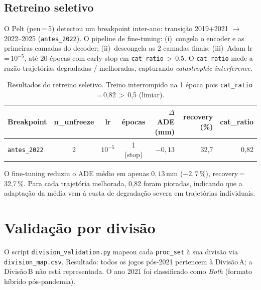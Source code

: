 \documentclass[11pt,a4paper]{article}
\begin{document}
\subsection{Retreino seletivo}

O Pelt (pen\,=\,5) detectou um breakpoint inter-ano: transi\c{c}\~ao
2019+2021 $\to$ 2022--2025 (\texttt{antes\_2022}). O pipeline de
fine-tuning: (i)~congela o encoder e as primeiras camadas do decoder;
(ii)~descongela as 2 camadas finais; (iii)~Adam lr\,=\,$10^{-5}$,
at\'e 20 \'epocas com early-stop em \texttt{cat\_ratio}\,$>$\,0{,}5.
O \texttt{cat\_ratio} mede a raz\~ao trajet\'orias degradadas /
melhoradas, capturando \emph{catastrophic interference}.

\begin{table}[h]
\centering
\small
\begin{tabular}{l c c c r r r}
\toprule
\textbf{Breakpoint} & \textbf{n\_unfreeze} & \textbf{lr}
    & \textbf{\'epocas} & \textbf{$\Delta$ADE (mm)}
    & \textbf{recovery (\%)} & \textbf{cat\_ratio} \\
\midrule
\texttt{antes\_2022} & 2 & $10^{-5}$ & 1 (stop) & $-0{,}13$ & 32{,}7 & 0{,}82 \\
\bottomrule
\end{tabular}
\caption{Resultados do retreino seletivo. Treino interrompido na 1\textordfeminine{} \'epoca
         pois \texttt{cat\_ratio}\,=\,0{,}82\,$>$\,0{,}5 (limiar).}
\label{tab:retrain}
\end{table}

O fine-tuning reduziu o ADE m\'edio em apenas $0{,}13$\,mm ($-2{,}7\,\%$),
recovery\,=\,32{,}7\,\%. Para cada trajet\'oria melhorada, 0{,}82 foram
pioradas, indicando que a adapta\c{c}\~ao da m\'edia vem \`a custa de
degrada\c{c}\~ao severa em trajet\'orias individuais.

\section{Valida\c{c}\~ao por divis\~ao}

O script \texttt{division\_validation.py} mapeou cada
\texttt{proc\_set} \`a sua divis\~ao via \texttt{division\_map.csv}.
Resultado: todos os jogos p\'os-2021 pertencem \`a Divis\~ao\,A;
a Divis\~ao\,B n\~ao est\'a representada. O ano 2021 foi classificado
como \emph{Both} (formato h\'ibrido p\'os-pandemia).
\end{document}
